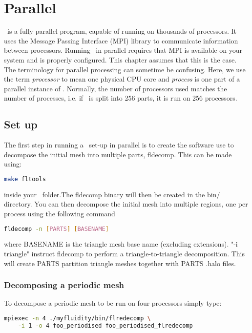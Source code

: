\chapter{Parallel}

\fluidity\ is a fully-parallel program, capable of running on thousands of processors. 
It uses the Message Passing Interface (MPI) library to communicate information between 
processors. Running \fluidity\ in parallel requires that MPI is available on your system
and is properly configured. This chapter assumes that this is the case. The 
terminology for parallel processing can sometime be confusing. Here, we use the 
term \emph{processor} to mean one physical CPU core and \emph{process} is one part
of a parallel instance of \fluidity. Normally, the number of processors used matches
the number of processes, i.e. if \fluidity\ is split into 256 parts, it is run on 256 processors.

\section{Set up}

The first step in running a \fluidity\ set-up in parallel is to create the software
use to decompose the initial mesh into multiple parts, fldecomp. This can be made using:
\begin{lstlisting}[language=bash]
make fltools
\end{lstlisting}
inside your \fluidity\ folder.The fldecomp binary will then be created in the bin/ directory. 
You can then decompose the initial mesh into multiple regions, one per process using the following command
\begin{lstlisting}[language=bash]
fldecomp -n [PARTS] [BASENAME]
\end{lstlisting}
where BASENAME is the triangle mesh base name (excluding extensions). "-i triangle"
instruct fldecomp to perform a triangle-to-triangle decomposition. 
This will create PARTS partition triangle meshes together with PARTS .halo files. 

\subsection{Decomposing a periodic mesh}

To decompose a periodic mesh to be run on four processors simply type:

\begin{lstlisting}[language=bash]
mpiexec -n 4 ./myfluidity/bin/flredecomp \
    -i 1 -o 4 foo_periodised foo_periodised_flredecomp
\end{lstlisting}

